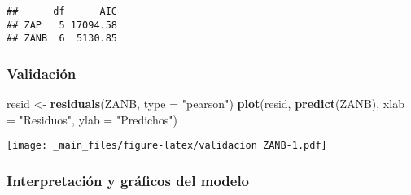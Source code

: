 \documentclass[
]{book}
\newenvironment{Shaded}{\begin{snugshade}}{\end{snugshade}}
\newcommand{\DataTypeTok}[1]{\textcolor[rgb]{0.13,0.29,0.53}{#1}}
\newcommand{\KeywordTok}[1]{\textcolor[rgb]{0.13,0.29,0.53}{\textbf{#1}}}
\newcommand{\NormalTok}[1]{#1}
\newcommand{\StringTok}[1]{\textcolor[rgb]{0.31,0.60,0.02}{#1}}
\begin{document}
\begin{verbatim}
##      df      AIC
## ZAP   5 17094.58
## ZANB  6  5130.85
\end{verbatim}

\hypertarget{validaciuxf3n}{%
\subsubsection{Validación}\label{validaciuxf3n}}

\begin{Shaded}
\begin{Highlighting}[]
\NormalTok{resid <-}\StringTok{ }\KeywordTok{residuals}\NormalTok{(ZANB, }\DataTypeTok{type =} \StringTok{"pearson"}\NormalTok{)}
\KeywordTok{plot}\NormalTok{(resid, }\KeywordTok{predict}\NormalTok{(ZANB), }\DataTypeTok{xlab =} \StringTok{"Residuos"}\NormalTok{, }\DataTypeTok{ylab =} \StringTok{"Predichos"}\NormalTok{)}
\end{Highlighting}
\end{Shaded}

\texttt{[image: \_main\_files/figure-latex/validacion ZANB-1.pdf]}

\hypertarget{interpretaciuxf3n-y-gruxe1ficos-del-modelo}{%
\subsubsection{Interpretación y gráficos del modelo}\label{interpretaciuxf3n-y-gruxe1ficos-del-modelo}}
\end{document}
